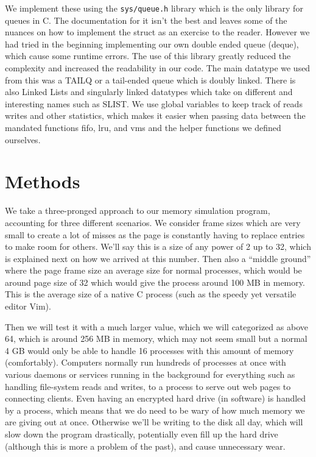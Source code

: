 \documentclass[12pt,letterpaper]{article}
\begin{document}
	We implement these using the \texttt{sys/queue.h} library which is the only library for queues in C. The documentation for it isn't the best and leaves some of the nuances on how to implement the struct as an exercise to the reader. However we had tried in the beginning implementing our own double ended queue (deque), which cause some runtime errors. The use of this library greatly reduced the complexity and increased the readability in our code. The main datatype we used from this was a TAILQ or a tail-ended queue which is doubly linked. There is also Linked Lists and singularly linked datatypes which take on different and interesting names such as SLIST. We use global variables to keep track of reads writes and other statistics, which makes it easier when passing data between the mandated functions fifo, lru, and vms and the helper functions we defined ourselves.
	
	\section{Methods}
	We take a three-pronged approach to our memory simulation program, accounting for three different scenarios. We consider frame sizes which are very small to create a lot of misses as the page is constantly having to replace entries to make room for others. We'll say this is a size of any power of 2 up to 32, which is explained next on how we arrived at this number. Then also a ``middle ground'' where the page frame size an average size for normal processes, which would be around page size of 32 which would give the process around 100 MB in memory. This is the average size of a native C process (such as the speedy yet versatile editor Vim).
	
	Then we will test it with a much larger value, which we will categorized as above 64, which is around 256 MB in memory, which may not seem small but a normal 4 GB would only be able to handle 16 processes with this amount of memory (comfortably). Computers normally run hundreds of processes at once with various daemons or services running in the background for everything such as handling file-system reads and writes, to a process to serve out web pages to connecting clients. Even having an encrypted hard drive (in software) is handled by a process, which means that we do need to be wary of how much memory we are giving out at once. Otherwise we'll be writing to the disk all day, which will slow down the program drastically, potentially even fill up the hard drive (although this is more a problem of the past), and cause unnecessary wear.
	
\end{document}
